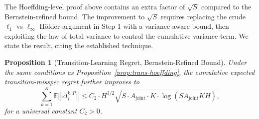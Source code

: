 \documentclass{article}
\newtheorem{proposition}[theorem]{Proposition}
\begin{document}
The Hoeffding-level proof above contains an extra factor of $\sqrt{S}$ compared to the Bernstein-refined bound. The improvement to $\sqrt{S}$ requires replacing the crude $\ell_1$-vs-$\ell_\infty$ Hölder argument in Step 1 with a variance-aware bound, then exploiting the law of total variance to control the cumulative variance term. We state the result, citing the established technique.

\begin{proposition}[Transition-Learning Regret, Bernstein-Refined Bound]
\label{prop:trans-bernstein}
Under the same conditions as Proposition~\ref{prop:trans-hoeffding}, the cumulative expected transition-misspec regret further improves to
\begin{equation}
\label{eq:trans-bernstein}
\sum_{k=1}^K \mathbb{E}\big[|\Delta_i^{k,P}|\big] \leq C_2 \cdot H^{3/2} \sqrt{S \cdot A_{\mathrm{joint}} \cdot K \cdot \log(SA_{\mathrm{joint}}KH)},
\end{equation}
for a universal constant $C_2 > 0$.
\end{proposition}
\end{document}
